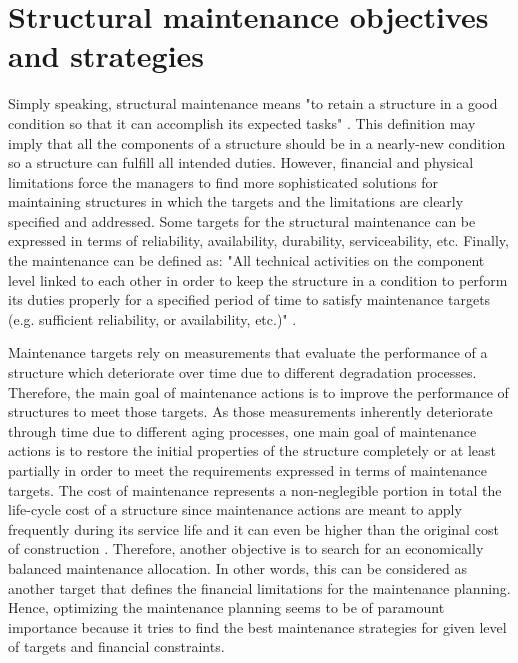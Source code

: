 \section{Structural maintenance objectives and strategies}

\noindent
Simply speaking, structural maintenance means "to retain a structure in a good condition so that it can accomplish its expected tasks" \citep{Van1994}. This definition may imply that 
all the components of a structure should be in a nearly-new condition so a structure can fulfill all intended duties. However, financial and physical limitations force the managers to 
find more sophisticated solutions for maintaining structures in which the targets and the limitations are clearly specified and addressed. Some targets for the structural maintenance 
can be expressed in terms of reliability, availability, durability, serviceability, etc. Finally, the maintenance can be defined as:
"All technical activities on the component level linked to each other in order to keep the structure in a condition to perform its duties properly for a specified period of time 
to satisfy maintenance targets (e.g. sufficient reliability, or availability, etc.)" \citep{Van1994}. 

Maintenance targets rely on measurements that evaluate the performance of a structure which deteriorate over time due to different degradation processes. Therefore, the main goal of 
maintenance actions is to improve the performance of structures to meet those targets. As those measurements inherently deteriorate through time due to different aging processes, one
main goal of maintenance actions is to restore the initial properties of the structure completely or at least partially in order to meet the requirements expressed in terms of 
maintenance targets. The cost of maintenance represents a non-neglegible portion in total the life-cycle cost of a structure since maintenance actions are meant to apply frequently 
during its service life and it can even be higher than the original cost of construction \citep{Allen2001}. Therefore, another 
objective is to search for an economically balanced maintenance allocation. In other words, this can be considered as another target that defines the financial 
limitations for the maintenance planning. Hence, optimizing the maintenance planning seems to be of paramount importance because it tries to find the best maintenance strategies for 
given level of targets and financial constraints. 


